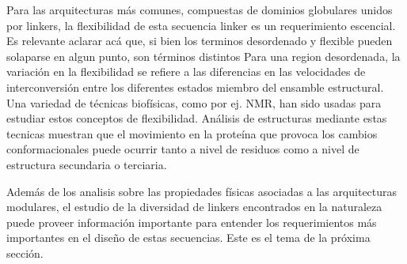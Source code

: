 Para las arquitecturas más comunes, compuestas de dominios globulares unidos por linkers, la flexibilidad de esta secuencia linker es un requerimiento escencial.
Es relevante aclarar acá que, si bien los terminos desordenado y flexible pueden solaparse en algun punto, son términos distintos\cite{radivojac2004protein}
Para una region desordenada, la variación en la flexibilidad se refiere a las diferencias en las velocidades de interconversión entre los diferentes estados miembro del ensamble estructural.
Una variedad de técnicas biofísicas, como por ej. NMR, han sido usadas para estudiar estos conceptos de flexibilidad.
Análisis de estructuras mediante estas tecnicas muestran que el movimiento en la proteína que provoca los cambios conformacionales puede ocurrir tanto a nivel de residuos como a nivel de estructura secundaria o terciaria. 




% 

Además de los analisis sobre las propiedades físicas asociadas a las arquitecturas modulares, el estudio de la diversidad de linkers encontrados en la naturaleza puede proveer información importante para entender los requerimientos
más importantes en el diseño de estas secuencias.
Este es el tema de la próxima sección.











